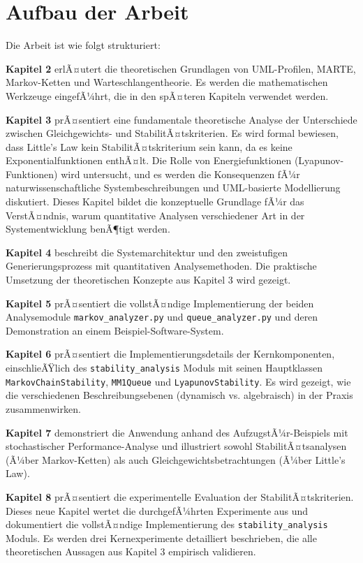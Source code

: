 ﻿\documentclass[a4paper,12pt]{report}
\theoremstyle{definition}
\begin{document}
\section{Aufbau der Arbeit}

Die Arbeit ist wie folgt strukturiert:

\textbf{Kapitel 2} erlÃ¤utert die theoretischen Grundlagen von UML-Profilen, MARTE, Markov-Ketten und Warteschlangentheorie. Es werden die mathematischen Werkzeuge eingefÃ¼hrt, die in den spÃ¤teren Kapiteln verwendet werden.

\textbf{Kapitel 3} prÃ¤sentiert eine fundamentale theoretische Analyse der Unterschiede zwischen Gleichgewichts- und StabilitÃ¤tskriterien. Es wird formal bewiesen, dass Little's Law kein StabilitÃ¤tskriterium sein kann, da es keine Exponentialfunktionen enthÃ¤lt. Die Rolle von Energiefunktionen (Lyapunov-Funktionen) wird untersucht, und es werden die Konsequenzen fÃ¼r naturwissenschaftliche Systembeschreibungen und UML-basierte Modellierung diskutiert. Dieses Kapitel bildet die konzeptuelle Grundlage fÃ¼r das VerstÃ¤ndnis, warum quantitative Analysen verschiedener Art in der Systementwicklung benÃ¶tigt werden.

\textbf{Kapitel 4} beschreibt die Systemarchitektur und den zweistufigen Generierungsprozess mit quantitativen Analysemethoden. Die praktische Umsetzung der theoretischen Konzepte aus Kapitel 3 wird gezeigt.

\textbf{Kapitel 5} prÃ¤sentiert die vollstÃ¤ndige Implementierung der beiden
Analysemodule \texttt{markov\_analyzer.py} und \texttt{queue\_analyzer.py}
und deren Demonstration an einem Beispiel-Software-System.

\textbf{Kapitel 6} prÃ¤sentiert die Implementierungsdetails der Kernkomponenten, einschlieÃŸlich des \texttt{stability\_analysis} Moduls mit seinen Hauptklassen \texttt{MarkovChainStability}, \texttt{MM1Queue} und \texttt{LyapunovStability}. Es wird gezeigt, wie die verschiedenen Beschreibungsebenen (dynamisch vs. algebraisch) in der Praxis zusammenwirken.

\textbf{Kapitel 7} demonstriert die Anwendung anhand des AufzugstÃ¼r-Beispiels mit stochastischer Performance-Analyse und illustriert sowohl StabilitÃ¤tsanalysen (Ã¼ber Markov-Ketten) als auch Gleichgewichtsbetrachtungen (Ã¼ber Little's Law).

\textbf{Kapitel 8} prÃ¤sentiert die experimentelle Evaluation der StabilitÃ¤tskriterien. Dieses neue Kapitel wertet die durchgefÃ¼hrten Experimente aus und dokumentiert die vollstÃ¤ndige Implementierung des \texttt{stability\_analysis} Moduls. Es werden drei Kernexperimente detailliert beschrieben, die alle theoretischen Aussagen aus Kapitel 3 empirisch validieren.
\end{document}
